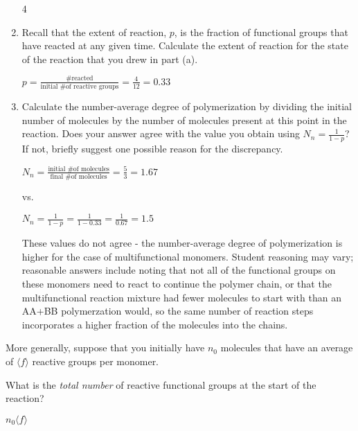 \begin{activity}
\begin{ctqs}
\begin{enumerate}
				\begin{solution}[0.5in]
					4
				\end{solution}
				
			\item Recall that the extent of reaction, $p$, is the fraction of functional groups that have reacted at any given time.  Calculate the extent of reaction for the state of the reaction that you drew in part (a).
			
				\begin{solution}[1.25in]
					$p = \frac{\text{\# reacted}}{\text{initial \# of reactive groups}} = \frac{4}{12} = 0.33$
				\end{solution}
				
			\item Calculate the number-average degree of polymerization by dividing the initial number of molecules by the number of molecules present at this point in the reaction.  Does your answer agree with the value you obtain using $N_n = \frac{1}{1-p}$?  If not, briefly suggest one possible reason for the discrepancy.
			
				\begin{solution}[2.25in]
					$N_n = \frac{\text{initial \# of molecules}}{\text{final \# of molecules}} = \frac{5}{3} = 1.67$
					
					vs.
					
					$N_n = \frac{1}{1-p} = \frac{1}{1-0.33} = \frac{1}{0.67} = 1.5$
					
					These values do not agree - the number-average degree of polymerization is higher for the case of multifunctional monomers.  Student reasoning may vary; reasonable answers include noting that not all of the functional groups on these monomers need to react to continue the polymer chain, or that the multifunctional reaction mixture had fewer molecules to start with than an AA+BB polymerzation would, so the same number of reaction steps incorporates a higher fraction of the molecules into the chains.
				\end{solution}
		\end{enumerate}

	\question More generally, suppose that you initially have $n_0$ molecules that have an average of $\langle f\rangle$ reactive groups per monomer.  
	
		What is the \emph{total number} of reactive functional groups at the start of the reaction?
	
			\begin{solution}[1in]
				$n_0 \langle f \rangle$
			\end{solution}
			

\end{ctqs}
\end{activity}
